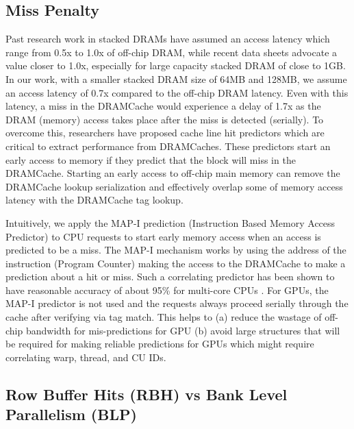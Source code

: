 \subsection{Miss Penalty}
Past research work in stacked DRAMs have assumed an access latency which range from 0.5x to 1.0x of off-chip DRAM, while recent data sheets advocate a value closer to 1.0x, especially for large capacity stacked DRAM of close to 1GB. In our work, with a smaller stacked DRAM size of 64MB and 128MB, we assume an access latency of 0.7x compared to the off-chip DRAM latency. Even with this latency, a miss in the DRAMCache would experience a delay of 1.7x as the DRAM (memory) access takes place after the miss is detected (serially). To overcome this, researchers have proposed cache line hit predictors \cite{loh-hill,alloy} which are critical to extract performance from DRAMCaches. These predictors start an early access to memory if they predict that the block will miss in the DRAMCache. Starting an early access to off-chip main memory can remove the DRAMCache lookup serialization and effectively overlap some of memory access latency with the DRAMCache tag lookup.
\par Intuitively, we apply the MAP-I prediction (Instruction Based Memory Access Predictor) \cite{alloy} to CPU requests to start early memory access when an access is predicted to be a miss. The MAP-I mechanism works by using the address of the instruction (Program Counter) making the access to the DRAMCache to make a prediction about a hit or miss. Such a correlating predictor has been shown to have reasonable accuracy of about 95\% for multi-core CPUs \cite{alloy}. For GPUs, the MAP-I predictor is not used and the requests always proceed serially through the cache after verifying via tag match. This helps to (a) reduce the wastage of off-chip bandwidth for mis-predictions for GPU (b) avoid large structures that will be required for making reliable predictions for GPUs which might require correlating warp, thread, and CU IDs.

\subsection{Row Buffer Hits (RBH) vs Bank Level Parallelism (BLP)} 

